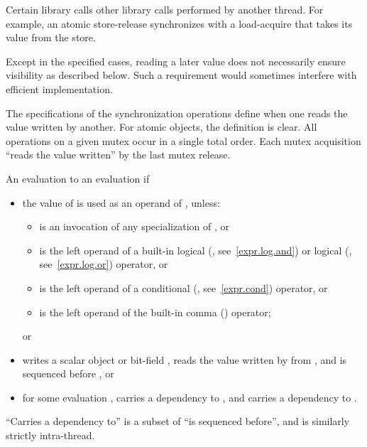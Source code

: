 \pnum
Certain library calls  other library calls performed by
another thread. For example, an atomic store-release synchronizes with a
load-acquire that takes its value from the store.
\begin{note} Except in the specified cases, reading a later value does not
necessarily ensure visibility as described below. Such a requirement would
sometimes interfere with efficient implementation. \end{note} \begin{note} The
specifications of the synchronization operations define when one reads the value
written by another. For atomic objects, the definition is clear. All operations
on a given mutex occur in a single total order. Each mutex acquisition ``reads
the value written'' by the last mutex release. \end{note}

\pnum
An evaluation   to an evaluation  if

\begin{itemize}
\item
the value of  is used as an operand of , unless:
\begin{itemize}
\item
{} is an invocation of any specialization of
, or
\item
{} is the left operand of a built-in logical  (\tcode{\&\&},
see~\ref{expr.log.and}) or logical  (\tcode{||}, see~\ref{expr.log.or})
operator, or
\item
{} is the left operand of a conditional (, see~\ref{expr.cond})
operator, or
\item
{} is the left operand of the built-in comma (\tcode{,})
operator; \end{itemize} or
\item
{} writes a scalar object or bit-field ,  reads the value
written by  from , and  is sequenced before , or
\item
for some evaluation ,  carries a dependency to , and
 carries a dependency to .
\end{itemize}
\begin{note} ``Carries a dependency to'' is a subset of ``is sequenced before'',
and is similarly strictly intra-thread. \end{note}

